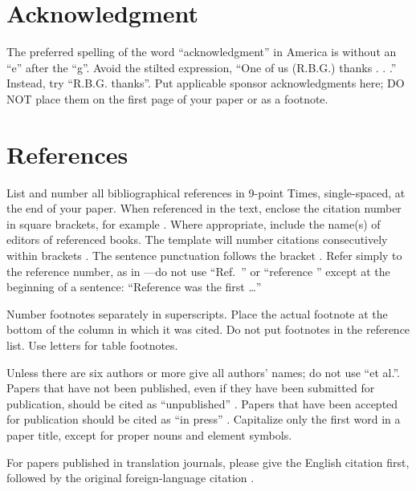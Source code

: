 \documentclass[conference,flushend]{iaria-lite}
\begin{document}
\section*{Acknowledgment}
The preferred spelling of the word “acknowledgment” in America is without an “e” after the “g”. Avoid the stilted expression, “One of us (R.B.G.) thanks . . .”  Instead, try 
“R.B.G. thanks”. Put applicable sponsor acknowledgments here; DO NOT place them on the first page of your paper or as a footnote.

\section*{References}
List and number all bibliographical references in 9-point Times, single-spaced, at the end of your paper. When referenced in the text, enclose the citation number in square brackets, for example \cite{eason1955certain}. Where appropriate, include the name(s) of editors of referenced books. The template will number citations consecutively within brackets \cite{eason1955certain}. The sentence punctuation follows the bracket \cite{maxwell1873treatise}. Refer simply to the reference number, as in \cite{jacobs1963fine}—do not use “Ref.\ \cite{jacobs1963fine}” or “reference \cite{jacobs1963fine}” except at the beginning of a sentence: “Reference \cite{jacobs1963fine} was the first \ldots”

Number footnotes separately in superscripts. Place the actual footnote at the bottom of the column in which it was cited. Do not put footnotes in the reference list. Use letters for table footnotes.

Unless there are six authors or more give all authors’ names; do not use “et al.”. Papers that have not been published, even if they have been submitted for publication, should be cited as “unpublished” \cite{four}. Papers that have been accepted for publication should be cited as “in press” \cite{five}. Capitalize only the first word in a paper title, except for proper nouns and element symbols.

For papers published in translation journals, please give the English citation first, followed by the original foreign-language citation \cite{yorozu1987electron}.

\nocite{kornack2001cell}
\nocite{kito2013emergent}
\nocite{goto2007efficient}


\vfill %
\begingroup
\printbibliography
\endgroup
\end{document}
